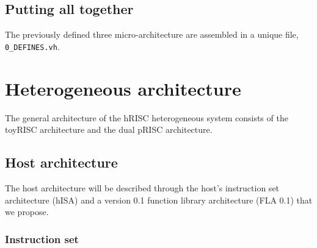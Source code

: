 \subsection{Putting all together}

The previously defined three micro-architecture are assembled in a unique file, {\tt 0\_DEFINES.vh}.



\section{Heterogeneous architecture}

The general architecture of the hRISC heterogeneous system consists of the toyRISC architecture and the dual pRISC architecture. 

\subsection{Host architecture}

The host architecture will be described through the host's instruction set architecture (hISA) and a version 0.1 function library architecture (FLA 0.1) that we propose.

\subsubsection{Instruction set}



